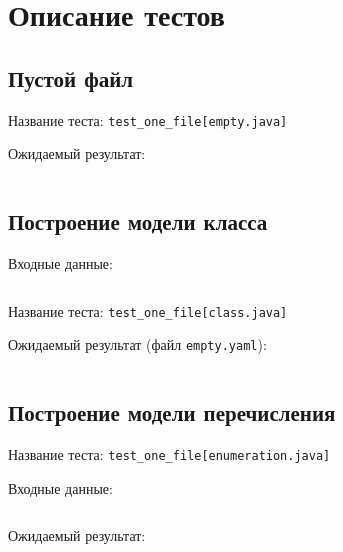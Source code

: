 
\inputminted{text}{inc/graph_matcher_test.log}


\inputminted{text}{inc/java_source_parser_test.log}


\inputminted{text}{inc/pattern_matcher_test.log}


\section*{Описание тестов}

\subsection*{Пустой файл}

Название теста: \verb;test_one_file[empty.java];

Ожидаемый результат:

\inputminted{yaml}{../src/test/data/model/empty.yaml}

\subsection*{Построение модели класса}

Входные данные:

\inputminted{java}{../src/test/data/src/class.java}

Название теста: \verb;test_one_file[class.java];

Ожидаемый результат (файл \verb;empty.yaml;):

\inputminted{yaml}{../src/test/data/model/class.yaml}

\subsection*{Построение модели перечисления}

Название теста: \verb;test_one_file[enumeration.java];

Входные данные:

\inputminted{java}{../src/test/data/src/enumeration.java}

Ожидаемый результат:

\inputminted{yaml}{../src/test/data/model/enumeration.yaml}


